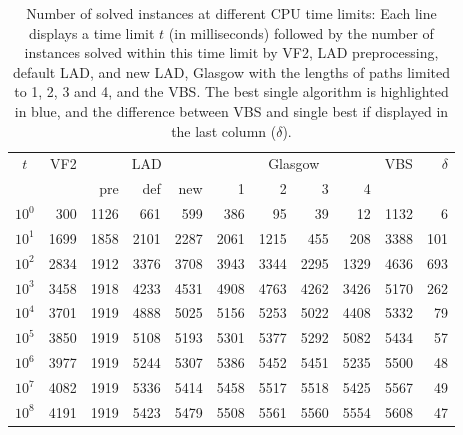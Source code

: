 \documentclass{llncs}
\begin{document}
\begin{table}[t]
\begin{center}
\begin{tabular}{|c||r||r|r|r||r|r|r|r||r|r|}
\hline
$t$ & VF2 & \multicolumn{3}{c||}{LAD} & \multicolumn{4}{c||}{Glasgow}& VBS & $\delta$\\
&&pre&def&new&1&2&3&4&&\\\hline
$10^0$ & 300 &  \cellcolor{blue!25}1126 & 661 & 599 & 386 & 95 & 39 & 12 & 1132 & 6\\\hline
$10^1$ & 1699 & 1858 & 2101 &  \cellcolor{blue!25}2287 & 2061 & 1215 & 455 & 208 & 3388 & 101\\\hline
$10^2$ & 2834 & 1912 & 3376 & 3708 &  \cellcolor{blue!25}3943 & 3344 & 2295 & 1329 & 4636 & 693\\\hline
$10^3$ & 3458 & 1918 & 4233 & 4531 &  \cellcolor{blue!25}4908 & 4763 & 4262 & 3426 & 5170 & 262\\\hline
$10^4$ & 3701 & 1919 & 4888 & 5025 & 5156 &  \cellcolor{blue!25}5253 & 5022 & 4408 & 5332 & 79\\\hline
$10^5$ & 3850 & 1919 & 5108 & 5193 & 5301 &  \cellcolor{blue!25}5377 & 5292 & 5082 & 5434 & 57\\\hline
$10^6$ & 3977 & 1919 & 5244 & 5307 & 5386 &  \cellcolor{blue!25}5452 & 5451 & 5235 & 5500 & 48\\\hline
$10^7$ & 4082 & 1919 & 5336 & 5414 & 5458 & 5517 &  \cellcolor{blue!25}5518 & 5425 & 5567 & 49\\\hline
$10^8$ & 4191 & 1919 & 5423 & 5479 & 5508 &  \cellcolor{blue!25}5561 & 5560 & 5554 & 5608 & 47\\\hline
\end{tabular}
\end{center}
\caption{Number of solved instances at different CPU time limits: Each line displays a time limit
$t$ (in milliseconds) followed by the number of instances solved within this time limit by VF2, LAD
preprocessing, default LAD, and new LAD, Glasgow with  the lengths of paths limited to 1, 2, 3 and
4, and the VBS. The best single algorithm is highlighted in blue, and the difference between VBS and
single best if displayed in the last column ($\delta$).\label{expTimeTable}}
\end{table}
\end{document}
